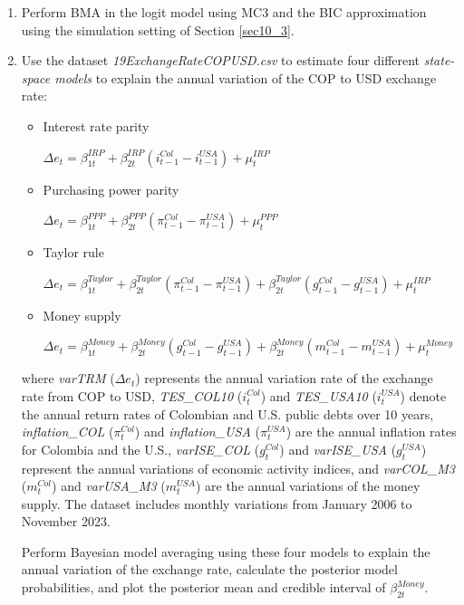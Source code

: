 \begin{enumerate}
\item Perform BMA in the logit model using MC3 and the BIC approximation using the simulation setting of Section \ref{sec10_3}.

\item Use the dataset \textit{19ExchangeRateCOPUSD.csv} to estimate four different \textit{state-space models} to explain the annual variation of the COP to USD exchange rate: 
\begin{itemize}
	\item Interest rate parity
	
	$\Delta e_t = \beta_{1t}^{IRP} + \beta_{2t}^{IRP} (i_{t-1}^{Col}-i_{t-1}^{USA})+\mu_{t}^{IRP}$ 
	\item Purchasing power parity
	
	$\Delta e_t = \beta_{1t}^{PPP} + \beta_{2t}^{PPP} (\pi_{t-1}^{Col}-\pi_{t-1}^{USA})+\mu_{t}^{PPP}$
	\item Taylor rule
	
	$\Delta e_t = \beta_{1t}^{Taylor} + \beta_{2t}^{Taylor} (\pi_{t-1}^{Col}-\pi_{t-1}^{USA})+\beta_{2t}^{Taylor} (g_{t-1}^{Col}-g_{t-1}^{USA})+\mu_{t}^{IRP}$
	\item Money supply
	
	$\Delta e_t = \beta_{1t}^{Money} + \beta_{2t}^{Money} (g_{t-1}^{Col}-g_{t-1}^{USA})+\beta_{2t}^{Money} (m_{t-1}^{Col}-m_{t-1}^{USA})+\mu_{t}^{Money}$   
\end{itemize}
where \textit{varTRM} ($\Delta e_t$) represents the annual variation rate of the exchange rate from COP to USD, \textit{TES\_COL10} ($i_{t}^{Col}$) and \textit{TES\_USA10} ($i_{t}^{USA}$) denote the annual return rates of Colombian and U.S. public debts over 10 years, \textit{inflation\_COL} ($\pi_{t}^{Col}$) and \textit{inflation\_USA} ($\pi_{t}^{USA}$) are the annual inflation rates for Colombia and the U.S., \textit{varISE\_COL} ($g_{t}^{Col}$) and \textit{varISE\_USA} ($g_{t}^{USA}$) represent the annual variations of economic activity indices, and \textit{varCOL\_M3} ($m_{t}^{Col}$) and \textit{varUSA\_M3} ($m_{t}^{USA}$) are the annual variations of the money supply. The dataset includes monthly variations from January 2006 to November 2023.

Perform Bayesian model averaging using these four models to explain the annual variation of the exchange rate, calculate the posterior model probabilities, and plot the posterior mean and credible interval of $\beta_{2t}^{Money}$.   


\end{enumerate}
